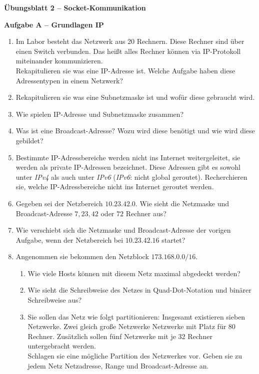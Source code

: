 \documentclass[paper=a4,fontsize=11pt]{scrartcl}%
\numberwithin{equation}{section}
\begin{document}
\begin{center}
\Large{\textbf{Übungsblatt 2 -- Socket-Kommunikation}}
\end{center}

\begin{center}\Large{\textbf{Aufgabe A -- Grundlagen IP}}\end{center}\vskip0.25in
\begin{enumerate}
	\item Im Labor besteht das Netzwerk aus 20 Rechnern. Diese Rechner sind über einen Switch verbunden. Das heißt alles Rechner können via IP-Protokoll miteinander kommunizieren.\\
	Rekapitulieren sie was eine IP-Adresse ist. Welche Aufgabe haben diese Adressentypen in einem Netzwerk?
	\item Rekapitulieren sie was eine Subnetzmaske ist und wofür diese gebraucht wird.
	\item Wie spielen IP-Adresse und Subnetzmaske zusammen?
	\item Was ist eine Broadcast-Adresse? Wozu wird diese benötigt und wie wird diese gebildet?
	\item Bestimmte IP-Adressbereiche werden nicht ins Internet weitergeleitet, sie werden als private IP-Adressen bezeichnet. Diese Adressen gibt es sowohl unter \emph{IPv4} als auch unter \emph{IPv6} (\emph{IPv6}: nicht global geroutet). Recherchieren sie, welche IP-Adressbereiche nicht ins Internet geroutet werden.
	\item Gegeben sei der Netzbereich $10.23.42.0$. Wie sieht die Netzmaske und Broadcast-Adresse $7, 23, 42$ oder $72$ Rechner aus? 
	\item Wie verschiebt sich die Netzmaske und Broadcast-Adresse der vorigen Aufgabe, wenn der Netzbereich bei $10.23.42.16$ startet?
	\item Angenommen sie bekommen den Netzblock $173.168.0.0/16$.
	\begin{enumerate}
		\item Wie viele Hosts können mit diesem Netz maximal abgedeckt werden?
		\item Wie sieht die Schreibweise des Netzes in Quad-Dot-Notation und binärer Schreibweise aus?
		\item Sie sollen das Netz wie folgt partitionieren: Insgesamt existieren sieben Netzwerke. Zwei gleich große Netzwerke Netzwerke mit Platz für 80 Rechner. Zusätzlich sollen fünf Netzwerke mit je 32 Rechner untergebracht werden.\\
		Schlagen sie eine mögliche Partition des Netzwerkes vor. Geben sie zu jedem Netz Netzadresse, Range und Broadcast-Adresse an.
\end{enumerate}		 
\end{enumerate}
\end{document}
